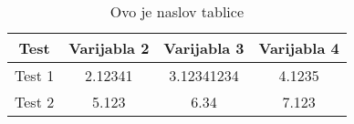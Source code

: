 
\begin{table}[ht!]
\centering
\begin{tabular}{@{}cccc@{}}
\toprule
 Test      & Varijabla 2 & Varijabla 3 & Varijabla 4 \\ \midrule
Test 1 & 2.12341     & 3.12341234  & 4.1235      \\
Test 2 & 5.123       & 6.34        & 7.123       \\ \bottomrule
\end{tabular}
\caption{Ovo je naslov tablice}
\label{tab:my-table}
\end{table}